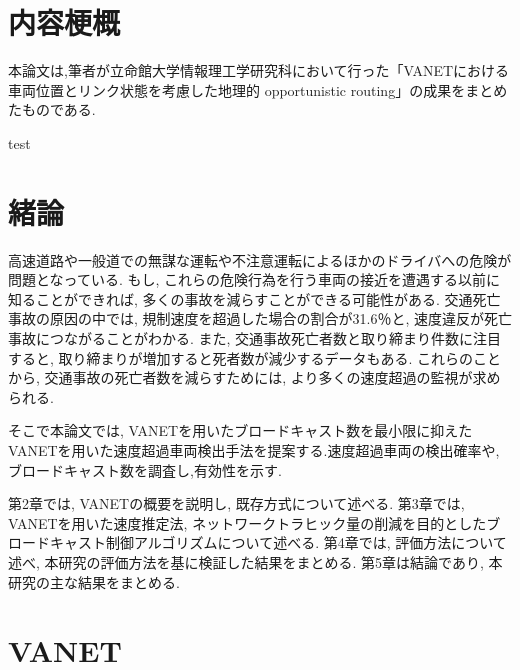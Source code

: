 \documentclass[10pt]{jreport}
\begin{document}
\maketitle


\renewcommand{\thepage}{\roman{page}}
\setcounter{page}{1}
\chapter*{内容梗概}
本論文は,筆者が立命館大学情報理工学研究科において行った「VANETにおける車両位置とリンク状態を考慮した地理的
opportunistic routing」の成果をまとめたものである.

test


\newpage
\pagestyle{myheadings}
\renewcommand{\thepage}{\roman{page}}
\tableofcontents


\newpage
\renewcommand{\thepage}{\arabic{page}}
\setcounter{page}{1}
\chapter{緒論}
\vspace{-5mm}

高速道路や一般道での無謀な運転や不注意運転によるほかのドライバへの危険が問題となっている. もし, これらの危険行為を行う車両の接近を遭遇する以前に知ることができれば, 多くの事故を減らすことができる可能性がある. 交通死亡事故の原因の中では, 規制速度を超過した場合の割合が31.6％\cite{1}と, 速度違反が死亡事故につながることがわかる. また, 交通事故死亡者数と取り締まり件数に注目すると, 取り締まりが増加すると死者数が減少するデータもある. これらのことから, 交通事故の死亡者数を減らすためには, より多くの速度超過の監視が求められる. 
 

そこで本論文では, VANETを用いたブロードキャスト数を最小限に抑えたVANETを用いた速度超過車両検出手法を提案する.速度超過車両の検出確率や,ブロードキャスト数を調査し,有効性を示す.

第2章では, VANETの概要を説明し, 既存方式について述べる. 第3章では, VANETを用いた速度推定法, ネットワークトラヒック量の削減を目的としたブロードキャスト制御アルゴリズムについて述べる. 第4章では, 評価方法について述べ, 本研究の評価方法を基に検証した結果をまとめる. 第5章は結論であり, 本研究の主な結果をまとめる. 



\chapter{VANET}
\vspace{-5mm}
\end{document}
